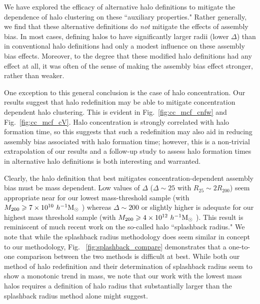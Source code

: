 \documentclass[usenatbib]{mnras}
\begin{document}
We have explored the efficacy of alternative halo definitions to mitigate the dependence of halo 
clustering on these ``auxiliary properties." Rather generally, we find that these alternative definitions 
do {\em not} mitigate the effects of assembly bias. In most cases, defining halos to have significantly 
larger radii (lower $\Delta$) than in conventional halo definitions had only a modest influence on 
these assembly bias effects. Moreover, to the degree that these modified halo definitions had 
any effect at all, it was often of the sense of 
making the assembly bias effect stronger, rather than weaker. 

One exception to this general conclusion is the case of halo concentration. 
Our results suggest that halo redefinition may be able to mitigate concentration 
dependent halo clustering. This is evident in Fig.~\ref{fig:cc_mcf_cnfw} and 
Fig.~\ref{fig:cc_mcf_cV}. Halo concentration is strongly correlated with halo formation 
time, so this suggests that such a redefinition may also aid in reducing assembly bias 
associated with halo formation time; however, this is a non-trivial extrapolation of our 
results and a follow-up study to assess halo formation times in alternative halo definitions 
is both interesting and warranted. 

Clearly, the halo definition that best mitigates 
concentration-dependent assembly bias must be mass dependent. Low 
values of $\Delta$ ($\Delta \sim 25$ with $R_{25} \sim 2R_{200}$) seem appropriate near for our lowest 
mass-threshold sample (with $M_{200} \geqslant 7 \times 10^{10} \ h^{-1}\mathrm{M}_{\odot}~$) whereas $\Delta \sim 200$ or slightly higher
is adequate for our highest mass threshold sample (with $M_{200} \geqslant 4 \times 10^{12} \ h^{-1}\mathrm{M}_{\odot}~$). This result is
reminiscent of much recent work on the so-called halo ``splashback radius."\citep{more_etal15} We note that while
the splashback radius methodology does seem similar in concept to our methodology, 
Fig. ~\ref{fig:splashback_compare} demonstrates that a one-to-one comparison between the two methods is difficult
at best. While both our method of halo redefinition and their determination of splashback radius seem to show a
monotonic trend in mass, we note that our work with the lowest mass halos requires a definition of halo radius
that substantially larger than the splashback radius method alone might suggest.
\end{document}

